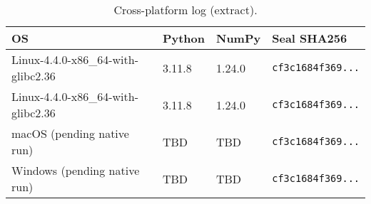 \begin{table}[t]
\caption{Cross-platform log (extract).}
\label{tab:xplat}
\centering
\begin{tabular}{llll}
\toprule
OS & Python & NumPy & Seal SHA256 \\
\midrule
Linux-4.4.0-x86_64-with-glibc2.36 & 3.11.8 & 1.24.0 & \texttt{cf3c1684f369...} \\
Linux-4.4.0-x86_64-with-glibc2.36 & 3.11.8 & 1.24.0 & \texttt{cf3c1684f369...} \\
macOS (pending native run) & TBD & TBD & \texttt{cf3c1684f369...} \\
Windows (pending native run) & TBD & TBD & \texttt{cf3c1684f369...} \\
\bottomrule
\end{tabular}
\end{table}
